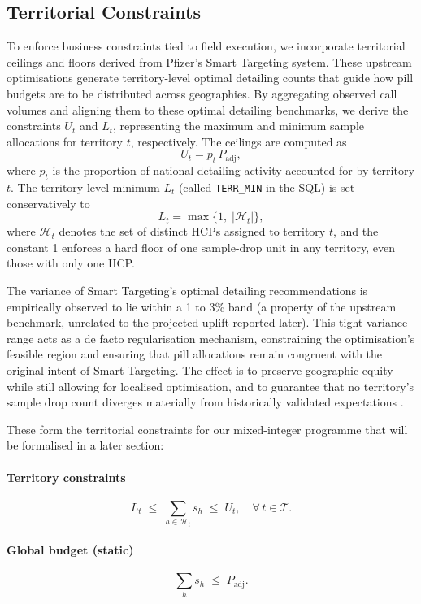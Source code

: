 \subsection{Territorial Constraints}\label{sec:territorial}

To enforce business constraints tied to field execution, we incorporate territorial ceilings and floors derived from Pfizer's Smart Targeting system. These upstream optimisations generate territory-level optimal detailing counts that guide how pill budgets are to be distributed across geographies. By aggregating observed call volumes and aligning them to these optimal detailing benchmarks, we derive the constraints \(U_t\) and \(L_t\), representing the maximum and minimum sample allocations for territory \(t\), respectively. The ceilings are computed as
\[
  U_t = p_t\,P_{\mathrm{adj}},
\]
where \(p_t\) is the proportion of national detailing activity accounted for by territory \(t\). The territory-level minimum \(L_t\) (called \texttt{TERR\_MIN} in the SQL) is set conservatively to
\[
  L_t = \max\{1,\;\lvert\mathcal H_t\rvert\},
\]
where \(\mathcal H_t\) denotes the set of distinct HCPs assigned to territory \(t\), and the constant 1 enforces a hard floor of one sample-drop unit in any territory, even those with only one HCP.

The variance of Smart Targeting's optimal detailing recommendations is empirically observed to lie within a 1 to 3\% band (a property of the upstream benchmark, unrelated to the projected uplift reported later). This tight variance range acts as a de facto regularisation mechanism, constraining the optimisation's feasible region and ensuring that pill allocations remain congruent with the original intent of Smart Targeting. The effect is to preserve geographic equity while still allowing for localised optimisation, and to guarantee that no territory's sample drop count diverges materially from historically validated expectations \citep{Awadhwal2023}.

These form the territorial constraints for our mixed-integer programme that will be formalised in a later section:

\paragraph{Territory constraints}
\[
  L_t \;\le\; \sum_{h\in\mathcal H_t} s_h \;\le\; U_t,
  \quad\forall\,t\in\mathcal T.
\]

\paragraph{Global budget (static)}
\[
  \sum_{h} s_h \;\le\; P_{\mathrm{adj}}.
\]

